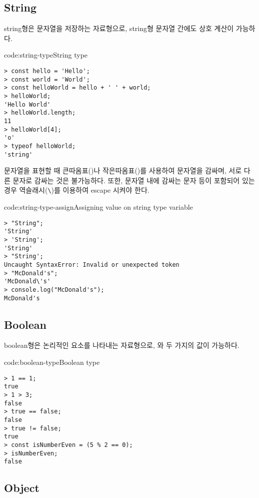 \subsection*{String}

string형은 문자열을 저장하는 자료형으로, string형 문자열 간에도 상호 계산이 가능하다.

\begin{code}{code:string-type}{String type}
\begin{verbatim}
> const hello = 'Hello';
> const world = 'World';
> const helloWorld = hello + ' ' + world;
> helloWorld;
'Hello World'
> helloWorld.length;
11
> helloWorld[4];
'o'
> typeof helloWorld;
'string'
\end{verbatim}
\end{code}

문자열을 표현할 때 큰따옴표()나 작은따옴표()를 사용하여 문자열을 감싸며, 서로 다른 문자로 감싸는 것은 불가능하다. 또한, 문자열 내에 감싸는 문자 등이 포함되어 있는 경우 역슬래시(\verb|\|)를 이용하여 escape 시켜야 한다.

\begin{code}{code:string-type-assign}{Assigning value on string type variable}
\begin{verbatim}
> "String";
'String'
> 'String';
'String'
> "String';
Uncaught SyntaxError: Invalid or unexpected token
> "McDonald's";
'McDonald\'s'
> console.log("McDonald's");
McDonald's
\end{verbatim}
\end{code}
\clearpage

\subsection*{Boolean}

boolean형은 논리적인 요소를 나타내는 자료형으로, 와  두 가지의 값이 가능하다.

\begin{code}{code:boolean-type}{Boolean type}
\begin{verbatim}
> 1 == 1;
true
> 1 > 3;
false
> true == false;
false
> true != false;
true
> const isNumberEven = (5 % 2 == 0);
> isNumberEven;
false
\end{verbatim}
\end{code}

\subsection*{Object}

